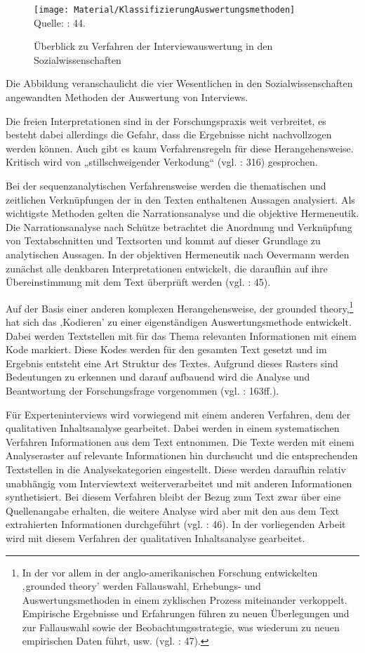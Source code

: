 \begin{figure}[H]\centering
\caption{Überblick zu Verfahren der Interviewauswertung in den Sozialwissenschaften}
\texttt{[image: Material/KlassifizierungAuswertungsmethoden]}\\
\normalsize{Quelle: \cite{glalau10} : 44.}
\end{figure}
Die Abbildung veranschaulicht die vier Wesentlichen in den Sozialwissenschaften angewandten Methoden der Auswertung von Interviews.\par
Die freien Interpretationen sind in der Forschungspraxis weit verbreitet, es besteht dabei allerdings die Gefahr, dass die Ergebnisse nicht nachvollzogen werden können. Auch gibt es kaum Verfahrensregeln für diese Herangehensweise. Kritisch wird von „stillschweigender Verkodung“ (vgl. \cite{hopf} : 316) gesprochen.\par
Bei der sequenzanalytischen Verfahrensweise werden die thematischen und zeitlichen Verknüpfungen der in den Texten enthaltenen Aussagen analysiert. Als wichtigste Methoden gelten die Narrationsanalyse und die objektive Hermeneutik. Die Narrationsanalyse nach Schütze betrachtet die Anordnung und Verknüpfung von Textabschnitten und Textsorten und kommt auf dieser Grundlage zu analytischen Aussagen. In der objektiven Hermeneutik nach Oevermann werden zunächst alle denkbaren Interpretationen entwickelt, die daraufhin auf ihre Übereinstimmung mit dem Text überprüft werden (vgl. \cite{glalau10} : 45).\par
Auf der Basis einer anderen komplexen Herangehensweise, der grounded theory,\footnote{In der vor allem in der anglo-amerikanischen Forschung entwickelten ‚grounded theory’ werden Fallauswahl, Erhebungs- und Auswertungsmethoden in einem zyklischen Prozess miteinander verkoppelt. Empirische Ergebnisse und Erfahrungen führen zu neuen Überlegungen und zur Fallauswahl sowie der Beobachtungsstrategie, was wiederum zu neuen empirischen Daten führt, usw. (vgl. \cite{glalau10} : 47).} hat sich das ‚Kodieren’ zu einer eigenständigen Auswertungsmethode entwickelt. Dabei werden Textstellen mit für das Thema relevanten Informationen mit einem Kode markiert. Diese Kodes werden für den gesamten Text gesetzt und im Ergebnis entsteht eine Art Struktur des Textes. Aufgrund dieses Rasters sind Bedeutungen zu erkennen und darauf aufbauend wird die Analyse und Beantwortung der Forschungsfrage vorgenommen (vgl. \cite{kruse} : 163ff.).\par
Für Experteninterviews wird vorwiegend mit einem anderen Verfahren, dem der qualitativen Inhaltsanalyse gearbeitet. Dabei werden in einem systematischen Verfahren Informationen aus dem Text entnommen. Die Texte werden mit einem Analyseraster auf relevante Informationen hin durchsucht und die entsprechenden Textstellen in die Analysekategorien eingestellt. Diese werden daraufhin relativ unabhängig vom Interviewtext weiterverarbeitet und mit anderen Informationen synthetisiert. Bei diesem Verfahren bleibt der Bezug zum Text zwar über eine Quellenangabe erhalten, die weitere Analyse wird aber mit den aus dem Text extrahierten Informationen durchgeführt (vgl. \cite{glalau10} : 46). In der vorliegenden Arbeit wird mit diesem Verfahren der qualitativen Inhaltsanalyse gearbeitet. \par
